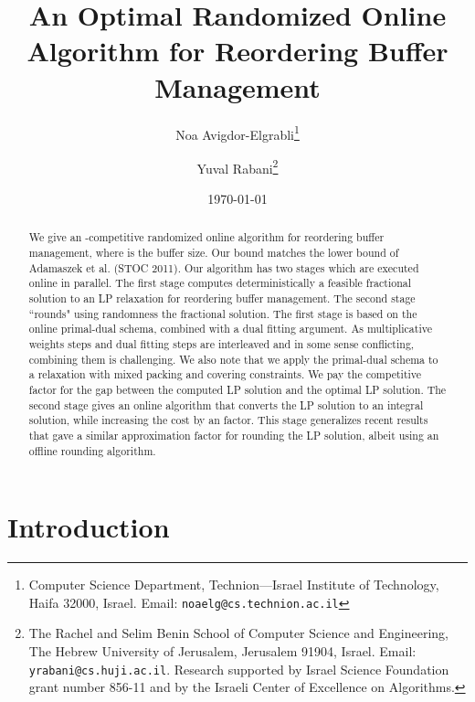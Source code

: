 \documentclass[12pt]{article}
\begin{document}
\title{An Optimal Randomized Online Algorithm for Reordering Buffer Management}



\author{
Noa Avigdor-Elgrabli\thanks{Computer Science Department,
Technion---Israel Institute of Technology, Haifa 32000, Israel.
Email: {\tt noaelg@cs.technion.ac.il}}
\and
Yuval Rabani\thanks{The Rachel and Selim Benin School of 
Computer Science and Engineering, The Hebrew University of Jerusalem,
Jerusalem 91904, Israel. Email: {\tt yrabani@cs.huji.ac.il}. Research
supported by Israel Science Foundation grant number 856-11 and
by the Israeli Center of Excellence on Algorithms.}
}

\date{\today}

\setcounter{footnote}{3}
\maketitle

\begin{abstract}
We give an -competitive randomized online
algorithm for reordering buffer management, where  is the
buffer size. Our bound matches the lower bound of
Adamaszek et al. (STOC 2011). Our algorithm has two stages
which are executed online in parallel. The first stage computes
deterministically a feasible fractional solution to an LP relaxation 
for reordering buffer management. The second stage ``rounds" 
using randomness the fractional solution. The first stage 
is based on the online primal-dual schema, combined with a 
dual fitting argument. As multiplicative weights steps and dual
fitting steps are interleaved and in some sense conflicting, 
combining them is challenging. We also note that we apply
the primal-dual schema to a relaxation with mixed packing
and covering constraints. We pay the  competitive 
factor for the gap between the computed LP solution and the
optimal LP solution. The second stage
gives an online algorithm that converts the LP solution to
an integral solution, while increasing the cost by an  
factor. This stage generalizes recent results that gave a
similar approximation factor for rounding the LP solution, 
albeit using an offline rounding algorithm.
\end{abstract}



\section{Introduction}
\end{document}
